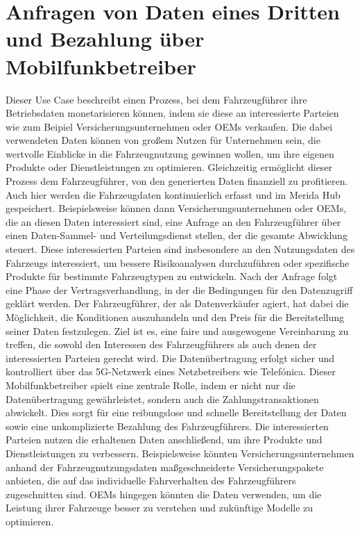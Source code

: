 \section{Anfragen von Daten eines Dritten und Bezahlung über Mobilfunkbetreiber}
Dieser Use Case beschreibt einen Prozess, bei dem Fahrzeugführer ihre Betriebsdaten monetarisieren können, indem sie diese an interessierte Parteien wie zum Beipiel Versicherungsunternehmen oder OEMs verkaufen. Die dabei verwendeten Daten können von großem Nutzen für Unternehmen sein, die wertvolle Einblicke in die Fahrzeugnutzung gewinnen wollen, um ihre eigenen Produkte oder Dienstleistungen zu optimieren. Gleichzeitig ermöglicht dieser Prozess dem Fahrzeugführer, von den generierten Daten finanziell zu profitieren.
\newline
Auch hier werden die Fahrzeugdaten kontinuierlich erfasst und im Merida Hub gespeichert. Beispielsweise können dann Versicherungsunternehmen oder OEMs, die an diesen Daten interessiert sind, eine Anfrage an den Fahrzeugführer über einen Daten-Sammel- und Verteilungsdienst stellen, der die gesamte Abwicklung steuert. Diese interessierten Parteien sind insbesondere an den Nutzungsdaten des Fahrzeugs interessiert, um bessere Risikoanalysen durchzuführen oder spezifische Produkte für bestimmte Fahrzeugtypen zu entwickeln.
\newline
\newline
Nach der Anfrage folgt eine Phase der Vertragsverhandlung, in der die Bedingungen für den Datenzugriff geklärt werden. Der Fahrzeugführer, der als Datenverkäufer agiert, hat dabei die Möglichkeit, die Konditionen auszuhandeln und den Preis für die Bereitstellung seiner Daten festzulegen. Ziel ist es, eine faire und ausgewogene Vereinbarung zu treffen, die sowohl den Interessen des Fahrzeugführers als auch denen der interessierten Parteien gerecht wird.
\newline
Die Datenübertragung erfolgt sicher und kontrolliert über das 5G-Netzwerk eines Netzbetreibers wie Telefónica. Dieser Mobilfunkbetreiber spielt eine zentrale Rolle, indem er nicht nur die Datenübertragung gewährleistet, sondern auch die Zahlungstransaktionen abwickelt. Dies sorgt für eine reibungslose und schnelle Bereitstellung der Daten sowie eine unkomplizierte Bezahlung des Fahrzeugführers.
\newline
Die interessierten Parteien nutzen die erhaltenen Daten anschließend, um ihre Produkte und Dienstleistungen zu verbessern. Beispielsweise könnten Versicherungsunternehmen anhand der Fahrzeugnutzungsdaten maßgeschneiderte Versicherungspakete anbieten, die auf das individuelle Fahrverhalten des Fahrzeugführers zugeschnitten sind. OEMs hingegen könnten die Daten verwenden, um die Leistung ihrer Fahrzeuge besser zu verstehen und zukünftige Modelle zu optimieren.
